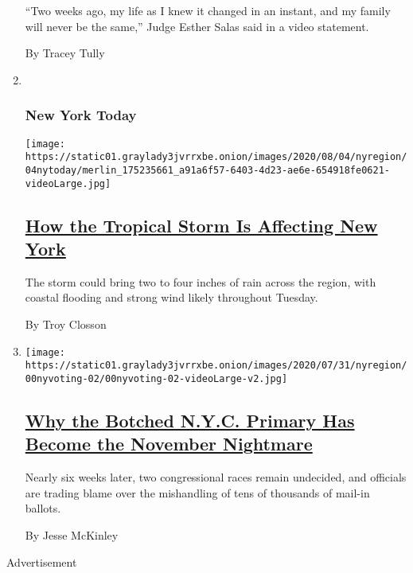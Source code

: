 \begin{enumerate}
  ``Two weeks ago, my life as I knew it changed in an instant, and my
  family will never be the same,'' Judge Esther Salas said in a video
  statement.

  By Tracey Tully
\item ~
  \hypertarget{new-york-today}{%
  \subsubsection{New York Today}\label{new-york-today}}

  \texttt{[image: https://static01.graylady3jvrrxbe.onion/images/2020/08/04/nyregion/04nytoday/merlin\_175235661\_a91a6f57-6403-4d23-ae6e-654918fe0621-videoLarge.jpg]}

  \hypertarget{how-the-tropical-storm-is-affecting-new-york}{%
  \subsection{\texorpdfstring{\href{/2020/08/04/nyregion/isaias-tropical-storm-nyc.html}{How
  the Tropical Storm Is Affecting New
  York}}{How the Tropical Storm Is Affecting New York}}\label{how-the-tropical-storm-is-affecting-new-york}}

  The storm could bring two to four inches of rain across the region,
  with coastal flooding and strong wind likely throughout Tuesday.~

  By Troy Closson
\item
  \texttt{[image: https://static01.graylady3jvrrxbe.onion/images/2020/07/31/nyregion/00nyvoting-02/00nyvoting-02-videoLarge-v2.jpg]}

  \hypertarget{why-the-botched-nyc-primary-has-become-the-november-nightmare}{%
  \subsection{\texorpdfstring{\href{/2020/08/03/nyregion/nyc-mail-ballots-voting.html}{Why
  the Botched N.Y.C. Primary Has Become the November
  Nightmare}}{Why the Botched N.Y.C. Primary Has Become the November Nightmare}}\label{why-the-botched-nyc-primary-has-become-the-november-nightmare}}

  Nearly six weeks later, two congressional races remain undecided, and
  officials are trading blame over the mishandling of tens of thousands
  of mail-in ballots.

  By Jesse McKinley
\end{enumerate}

Advertisement

